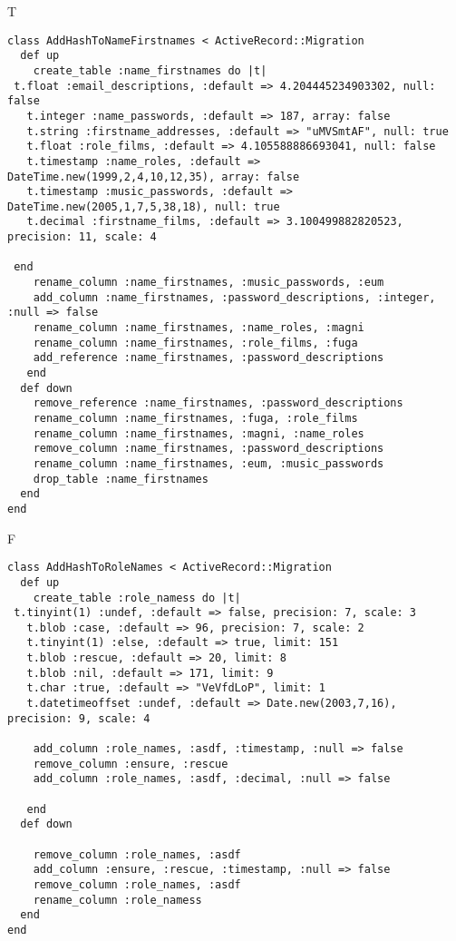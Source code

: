 T
\begin{verbatim}
class AddHashToNameFirstnames < ActiveRecord::Migration
  def up
    create_table :name_firstnames do |t|
 t.float :email_descriptions, :default => 4.204445234903302, null: false
   t.integer :name_passwords, :default => 187, array: false
   t.string :firstname_addresses, :default => "uMVSmtAF", null: true
   t.float :role_films, :default => 4.105588886693041, null: false
   t.timestamp :name_roles, :default => DateTime.new(1999,2,4,10,12,35), array: false
   t.timestamp :music_passwords, :default => DateTime.new(2005,1,7,5,38,18), null: true
   t.decimal :firstname_films, :default => 3.100499882820523, precision: 11, scale: 4

 end
    rename_column :name_firstnames, :music_passwords, :eum
    add_column :name_firstnames, :password_descriptions, :integer, :null => false
    rename_column :name_firstnames, :name_roles, :magni
    rename_column :name_firstnames, :role_films, :fuga
    add_reference :name_firstnames, :password_descriptions
   end
  def down
    remove_reference :name_firstnames, :password_descriptions
    rename_column :name_firstnames, :fuga, :role_films
    rename_column :name_firstnames, :magni, :name_roles
    remove_column :name_firstnames, :password_descriptions
    rename_column :name_firstnames, :eum, :music_passwords
    drop_table :name_firstnames
  end
end
\end{verbatim}

F
\begin{verbatim}
class AddHashToRoleNames < ActiveRecord::Migration
  def up
    create_table :role_namess do |t| 
 t.tinyint(1) :undef, :default => false, precision: 7, scale: 3
   t.blob :case, :default => 96, precision: 7, scale: 2
   t.tinyint(1) :else, :default => true, limit: 151
   t.blob :rescue, :default => 20, limit: 8
   t.blob :nil, :default => 171, limit: 9
   t.char :true, :default => "VeVfdLoP", limit: 1
   t.datetimeoffset :undef, :default => Date.new(2003,7,16), precision: 9, scale: 4

    add_column :role_names, :asdf, :timestamp, :null => false
    remove_column :ensure, :rescue
    add_column :role_names, :asdf, :decimal, :null => false

   end
  def down

    remove_column :role_names, :asdf
    add_column :ensure, :rescue, :timestamp, :null => false
    remove_column :role_names, :asdf
    rename_column :role_namess
  end
end
\end{verbatim}

